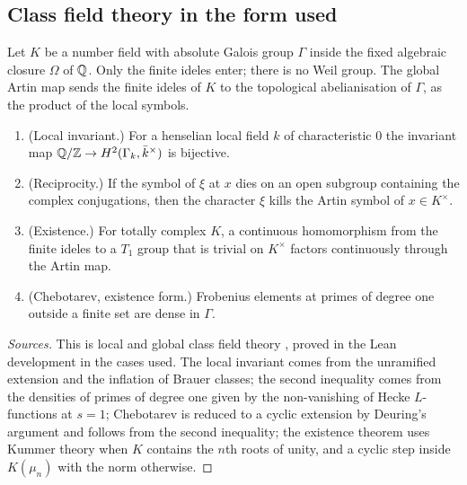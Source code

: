 \subsection{Class field theory in the form used}\label{ss:B-classfield}
Let $K$ be a number field with absolute Galois group $\Gamma$ inside the fixed algebraic closure $\Omega$ of $\mathbb{Q}$. Only the finite ideles enter; there is no Weil group. The global Artin map sends the
finite ideles of $K$ to the topological abelianisation of $\Gamma$, as the product of the local symbols.

\begin{theorem}\label{thm:B-classfield}
\begin{enumerate}[label=\textup{(\alph*)}]
\item (Local invariant.) For a henselian local field $k$ of characteristic $0$ the invariant map $\mathbb{Q}/\mathbb{Z}\to H^2(\Gamma_k,\bar k^\times)$ is bijective.
\item (Reciprocity.) If the symbol of $\xi$ at $x$ dies on an open subgroup containing the complex conjugations, then the character $\xi$ kills the Artin symbol of $x\in K^\times$.
\item (Existence.) For totally complex $K$, a continuous homomorphism from the finite ideles to a $T_1$ group that is trivial on $K^\times$ factors continuously through the Artin map.
\item (Chebotarev, existence form.) Frobenius elements at primes of degree one outside a finite set are dense in $\Gamma$.
\end{enumerate}
\end{theorem}

\begin{proof}[Sources]
This is local and global class field theory \cite{Serre1997,Milne2006}, proved in the Lean development in the cases used. The local invariant comes from the unramified extension and the inflation of Brauer
classes; the second inequality comes from the densities of primes of degree one given by the non-vanishing of Hecke $L$-functions at $s=1$; Chebotarev is reduced to a cyclic extension by Deuring's
argument and follows from the second inequality; the existence theorem uses Kummer theory when $K$ contains the $n$th roots of unity, and a cyclic step inside $K(\mu_n)$ with the norm otherwise.
\end{proof}

